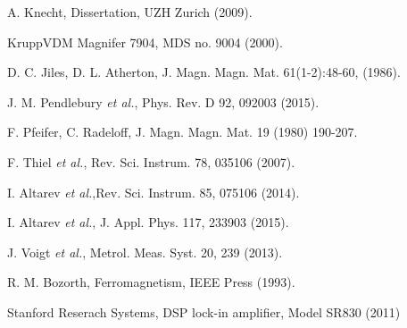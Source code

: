 \documentclass[review]{elsarticle}
\begin{document}
\begin{thebibliography}{00}
 A. Knecht, Dissertation, UZH Zurich (2009).

 KruppVDM Magnifer 7904, MDS no. 9004 (2000).

 D. C. Jiles, D. L. Atherton,  J. Magn. Magn. Mat. 61(1-2):48-60, (1986).

 J. M. Pendlebury {\it et al.}, Phys. Rev. D 92, 092003 (2015).

 F. Pfeifer, C. Radeloff, J. Magn. Magn. Mat. 19 (1980) 190-207.

 F. Thiel {\it et al.}, Rev. Sci. Instrum. 78, 035106 (2007).

 I. Altarev {\it et al.},Rev. Sci. Instrum. 85, 075106 (2014).

 I. Altarev {\it et al.}, J. Appl. Phys. 117, 233903 (2015).

 J. Voigt {\it et al.}, Metrol. Meas. Syst. 20, 239 (2013).

 R. M. Bozorth, Ferromagnetism, IEEE Press (1993).

 Stanford Reserach Systems, DSP lock-in amplifier, Model SR830 (2011)
\end{thebibliography}
\end{document}
